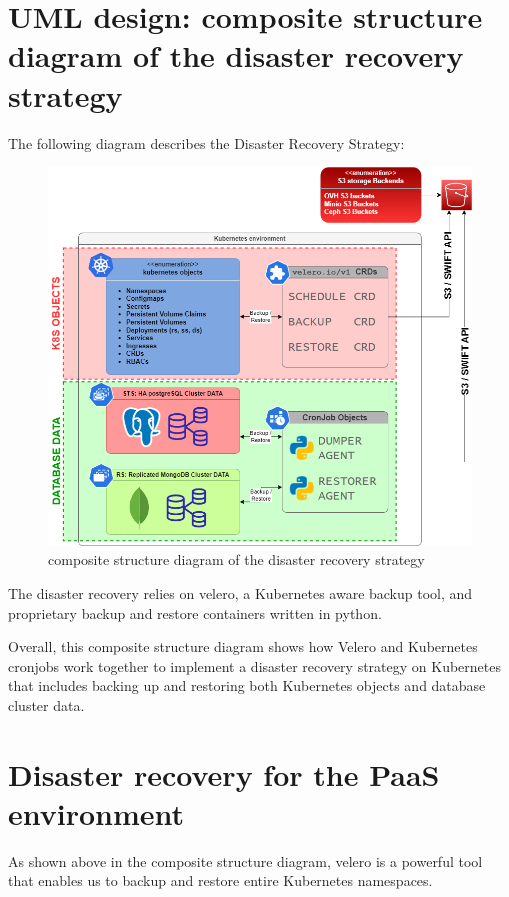 \newpage

\section{UML design: composite structure diagram of the disaster recovery strategy }

The following diagram describes the Disaster Recovery Strategy: 

\begin{figure}[H]\centering
    \includegraphics[width=1.0\textwidth,angle=00]{assets/f56.png}
    \caption{composite structure diagram of the disaster recovery strategy }
    \label{fig:f56}
\end{figure}

The disaster recovery relies on velero, a Kubernetes aware backup tool, and proprietary backup and restore containers written in python. 

Overall, this composite structure diagram shows how Velero and Kubernetes cronjobs work together to implement a disaster recovery strategy on Kubernetes that includes backing up and restoring both Kubernetes objects and database cluster data. 

\section{Disaster recovery for the PaaS environment }

As shown above in the composite structure diagram, velero is a powerful tool that enables us to backup and restore entire Kubernetes namespaces. 

